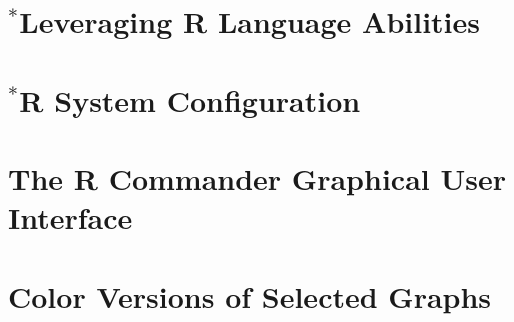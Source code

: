 \documentclass{tufte-book}\usepackage[]{graphicx}\usepackage[]{color}
\begin{document}
\chapter{$^*$Leveraging R Language Abilities }


\appendix

\chapter{$^*$R System Configuration}\label{ch:sys}

\cleartooddpage

\chapter{The R Commander Graphical User Interface}

\cleartooddpage

\chapter{Color Versions of Selected Graphs}\label{app:C}





\renewcommand{\indexname}{Index of Functions}

\begin{fullwidth}
\printindex[fun]
\renewcommand{\indexname}{Index of Terms}
\printindex[default]
\end{fullwidth}

\end{document}
